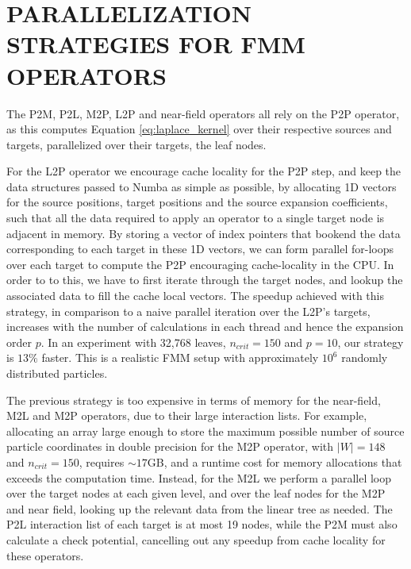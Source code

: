 \documentclass{IEEEcsmag}
\begin{document}


\section{PARALLELIZATION STRATEGIES FOR FMM OPERATORS}

The P2M, P2L, M2P, L2P and near-field operators all rely on the P2P operator, as this computes Equation \eqref{eq:laplace_kernel} over their respective sources and targets, parallelized over their targets, the leaf nodes.

For the L2P operator we encourage cache locality for the P2P step, and keep the data structures passed to Numba as simple as possible, by allocating 1D vectors for the source positions, target positions and the source expansion coefficients, such that all the data required to apply an operator to a single target node is adjacent in memory. By storing a vector of index pointers that bookend the data corresponding to each target in these 1D vectors, we can form parallel for-loops over each target to compute the P2P encouraging cache-locality in the CPU. In order to to this, we have to first iterate through the target nodes, and lookup the associated data to fill the cache local vectors.
The speedup achieved with this strategy, in comparison to a naive parallel iteration over the L2P's targets, increases with the number of calculations in each thread and hence the expansion order $p$. In an experiment with 32,768 leaves, $n_{crit} = 150$ and $p=10$, our strategy is $13\%$ faster. This is a realistic FMM setup with approximately $10^6$ randomly distributed particles.

The previous strategy is too expensive in terms of memory for the near-field, M2L and M2P operators, due to their large interaction lists. For example, allocating an array large enough to store the maximum possible number of source particle coordinates in double precision for the M2P operator, with $|W|=148$ and $n_{crit}=150$, requires $\sim 17$GB, and a runtime cost for memory allocations that exceeds the computation time. Instead, for the M2L we perform a parallel loop over the target nodes at each given level, and over the leaf nodes for the M2P and near field, looking up the relevant data from the linear tree as needed. The P2L interaction list of each target is at most 19 nodes, while the P2M must also calculate a check potential, cancelling out any speedup from cache locality for these operators.
\end{document}
